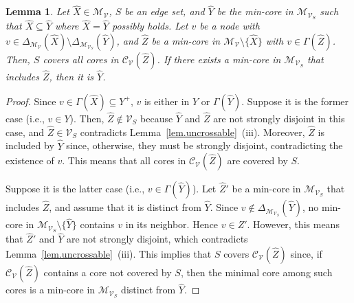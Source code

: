 \documentclass[11pt]{article}
\newtheorem{lemma}{Lemma}
\newcommand{\Mfam}{\mathcal{M}}
\newcommand{\Cfam}{\mathcal{C}}
\newcommand{\Vfam}{\mathcal{V}}
\begin{document}
\begin{lemma}\label{lem.neighbor}
 Let $\hat{X} \in \Mfam_{\Vfam}$, $S$ be an edge set, and $\hat{Y}$ be the
 min-core in $\Mfam_{\Vfam_S}$ 
 such that $\hat{X}
 \subseteq \hat{Y}$ where $\hat{X}=\hat{Y}$ possibly holds.
 Let $v$ be a node with
 $v \in \Delta_{\Mfam_{\Vfam}}(\hat{X}) \setminus \Delta_{\Mfam_{\Vfam_S}}(\hat{Y})$,
 and $\hat{Z}$ be a min-core in $\Mfam_{\Vfam} \setminus \{\hat{X}\}$ with $v \in \Gamma(\hat{Z})$.
 Then, $S$ covers all cores in $\Cfam_{\Vfam}(\hat{Z})$. If there exists a min-core in
 $\Mfam_{\Vfam_S}$ that includes $\hat{Z}$, then it is $\hat{Y}$.
\end{lemma}
\begin{proof}
 Since $v \in \Gamma(\hat{X}) \subseteq Y^+$,
 $v$ is either in $Y$ or $\Gamma(\hat{Y})$.
 Suppose it is the former case (i.e., $v \in Y$). Then, $\hat{Z} \not\in
 \Vfam_S$ 
 because $\hat{Y}$ and $\hat{Z}$ are not strongly disjoint in this case,
 and $\hat{Z} \in \Vfam_S$
 contradicts Lemma~\ref{lem.uncrossable}~(iii).
 Moreover, $\hat{Z}$ is
 included by $\hat{Y}$ 
 since, otherwise, they must be strongly disjoint, contradicting the
 existence of $v$.
 This means that all cores
 in $\Cfam_{\Vfam}(\hat{Z})$ are covered by $S$.

 Suppose it is the latter case (i.e., $v \in \Gamma(\hat{Y})$). 
 Let $\hat{Z}'$ be a min-core in $\Mfam_{\Vfam_S}$ that includes $\hat{Z}$, and
 assume that it is distinct from $\hat{Y}$.
 Since $v \not\in \Delta_{\Mfam_{\Vfam_S}}(\hat{Y})$, no min-core
 in $\Mfam_{\Vfam_S} \setminus \{\hat{Y}\}$ contains $v$ in its neighbor.
 Hence $v \in Z'$.
 However, this means that 
 $\hat{Z}'$ and $\hat{Y}$ are not strongly disjoint, which contradicts
 Lemma~\ref{lem.uncrossable}~(iii).
 This implies that $S$ covers $\Cfam_{\Vfam}(\hat{Z})$ since,
 if $\Cfam_{\Vfam}(\hat{Z})$ contains a core not covered by $S$, then
 the minimal core among such cores is a min-core in $\Mfam_{\Vfam_S}$ distinct
 from $\hat{Y}$.
\end{proof}
\end{document}
